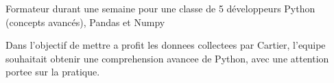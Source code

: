 Formateur durant une semaine pour une classe de 5 développeurs
Python (concepts avancés), Pandas et Numpy

Dans l'objectif de mettre a profit les donnees collectees par Cartier, l'equipe souhaitait obtenir une comprehension avancee de Python, avec une attention portee sur la pratique.

\sectionspace
